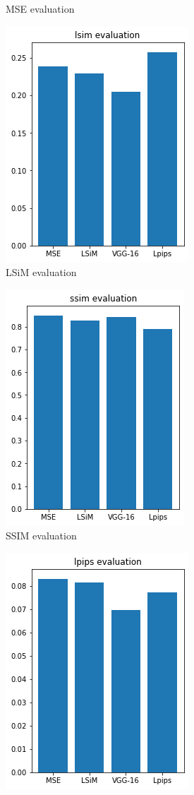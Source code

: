 \documentclass[a4paper,12pt,twoside]{report}
\begin{document}
\begin{figure}
\begin{subfigure}{0.32\textwidth}
		\caption{MSE evaluation}
	\end{subfigure}
	\begin{subfigure}{0.32\textwidth}
		\centering
		\includegraphics[scale=0.5]{superresolution/lsim.png}
		\caption{LSiM evaluation}
	\end{subfigure}
	\begin{subfigure}{0.32\textwidth}
		\centering
		\includegraphics[scale=0.5]{superresolution/ssim.png}
		\caption{SSIM evaluation}
	\end{subfigure}
	\begin{subfigure}{0.32\textwidth}
		\centering
		\includegraphics[scale=0.5]{superresolution/lpips.png}

\end{subfigure}
\end{figure}
\end{document}
